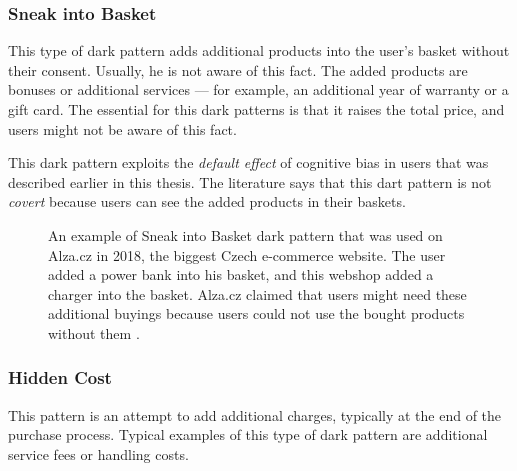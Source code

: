         \subsubsection{Sneak into Basket}
        This type of dark pattern adds additional products into the user's basket without their consent. Usually, he is not aware of this fact. The added products are bonuses or additional services — for example, an additional year of warranty or a gift card. The essential for this dark patterns is that it raises the total price, and users might not be aware of this fact. 
        
        This dark pattern exploits the \emph{default effect} of cognitive bias in users that was described earlier in this thesis. The literature says that this dart pattern is not \emph{covert} because users can see the added products in their baskets.

        \begin{figure}[ht]
            \centering
            \caption{An example of Sneak into Basket dark pattern that was used on Alza.cz in 2018, the biggest Czech e-commerce website. The user added a power bank into his basket, and this webshop added a charger into the basket. Alza.cz claimed that users might need these additional buyings because users could not use the bought products without them \cite{alza-sneak-into-basket-idnes}.}
            \label{fig:alza-sneak-into-basket}
        \end{figure}

        \subsubsection{Hidden Cost}
        This pattern is an attempt to add additional charges, typically at the end of the purchase process. Typical examples of this type of dark pattern are additional service fees or handling costs. 
        
